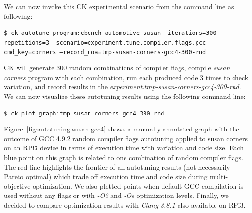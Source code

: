 We can now invoke this CK experimental scenario from the command line as following:

\begin{flushleft}
\texttt{\$ ck autotune program:cbench-automotive-susan --iterations=300 --repetitions=3 
  --scenario=experiment.tune.compiler.flags.gcc
  --cmd\_key=corners --record\_uoa=tmp-susan-corners-gcc4-300-rnd}
\end{flushleft}

CK will generate 300 random combinations of compiler flags, compile \textit{susan corners} program 
with each combination, run each produced code 3 times to check variation, and record
results in the \textit{experiment:tmp-susan-corners-gcc4-300-rnd}.
%
We can now visualize these autotuning results using the following command line:
\begin{flushleft}
\texttt{\$ ck plot graph:tmp-susan-corners-gcc4-300-rnd}
\end{flushleft}

Figure~\ref{fig:autotuning-susan-gcc4} shows a manually annotated graph 
with the outcome of GCC 4.9.2 random compiler flags autotuning 
applied to susan corners on an RPi3 device in terms of execution 
time with variation and code size.
%
Each blue point on this graph is related to one combination of random compiler flags.
%
The red line highlights the frontier of all autotuning results (not necessarily Pareto optimal) 
which trade off execution time and code size during multi-objective optimization.
%
We also plotted points when default GCC compilation is used without any flags 
or with \textit{-O3} and \textit{-Os} optimization levels.
%
Finally, we decided to compare optimization results with \textit{Clang 3.8.1} also available on RPi3.

